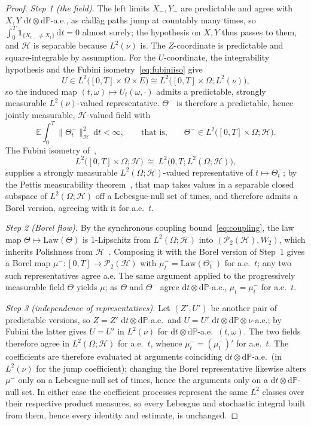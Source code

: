 \documentclass[preprint,12pt]{elsarticle}
\newcommand{\E}{\mathbb{E}}
\newcommand{\Prob}{\mathbb{P}}
\newcommand{\diff}{\mathrm{d}}
\newcommand{\Lnu}{L^2(\nu)}
\newcommand{\Law}{\mathrm{Law}}
\numberwithin{equation}{section}
\theoremstyle{plain}
\theoremstyle{definition}
\theoremstyle{\PaperRemarkStyle}
\begin{document}
\begin{proof}
\emph{Step 1 (the field).} The left limits $X_-,Y_-$ are predictable and agree with $X,Y$
$\diff t\otimes\diff\Prob$-a.e., as c\`adl\`ag paths jump at countably many times, so
$\int_0^T\mathbf 1_{\{X_{t-}\neq X_t\}}\,\diff t=0$ almost surely; the hypothesis on
$X,Y$ thus passes to them, and $\mathcal H$ is separable because $\Lnu$ is. The
$Z$-coordinate is predictable and square-integrable by assumption. For the
$U$-coordinate, the integrability hypothesis and the Fubini
isometry~\eqref{eq:fubiniiso} give
\[
U\in L^2\bigl([0,T]\times\Omega\times E\bigr)\cong L^2\bigl([0,T]\times\Omega;\Lnu\bigr),
\]
so the induced map $(t,\omega)\mapsto U_t(\omega,\cdot)$ admits a predictable, strongly
measurable $\Lnu$-valued representative. $\Theta^-$ is therefore a
predictable, hence jointly measurable, $\mathcal H$-valued field with
\[
\E\int_0^T\|\Theta_t^-\|_{\mathcal H}^2\,\diff t<\infty,
\qquad\text{that is,}\qquad
\Theta^-\in L^2\bigl([0,T]\times\Omega;\mathcal H\bigr).
\]
The Fubini isometry of~\cite[Proposition~1.2.24]{HNVW},
\[
L^2\bigl([0,T]\times\Omega;\mathcal H\bigr)\ \cong\ L^2\bigl(0,T;L^2(\Omega;\mathcal H)\bigr),
\]
supplies a strongly measurable
$L^2(\Omega;\mathcal H)$-valued representative of $t\mapsto\Theta_t^-$; by the Pettis
measurability theorem~\cite[Theorem~1.1.6]{HNVW}, that map takes values in a separable
closed subspace of $L^2(\Omega;\mathcal H)$ off a Lebesgue-null set of times, and
therefore admits a Borel version, agreeing with it for a.e.\ $t$.

\emph{Step 2 (Borel flow).} By the synchronous coupling bound~\eqref{eq:coupling}, the
law map $\Theta\mapsto\Law(\Theta)$ is $1$-Lipschitz from $L^2(\Omega;\mathcal H)$ into
$(\mathcal P_2(\mathcal H),W_2)$, which inherits Polishness from
$\mathcal H$~\cite[Ch.~6]{Villani2009}. Composing it with the Borel version of Step~1 gives a
Borel map $\mu^-:[0,T]\to\mathcal P_2(\mathcal H)$ with $\mu_t^-=\Law(\Theta_t^-)$
for a.e.\ $t$; any two such representatives agree a.e. The same argument applied to
the progressively measurable field $\Theta$ yields $\mu$; as $\Theta$ and $\Theta^-$
agree $\diff t\otimes\diff\Prob$-a.e., $\mu_t=\mu_t^-$ for a.e.\ $t$.

\emph{Step 3 (independence of representatives).} Let $(Z',U')$ be another pair of
predictable versions, so $Z=Z'$ $\diff t\otimes\diff\Prob$-a.e.\ and $U=U'$
$\diff t\otimes\diff\Prob\otimes\nu$-a.e.; by Fubini the latter gives $U=U'$ in $\Lnu$
for $\diff t\otimes\diff\Prob$-a.e.\ $(t,\omega)$. The two fields therefore agree in
$L^2(\Omega;\mathcal H)$ for a.e.\ $t$, whence $\mu_t^-=(\mu_t^-)'$ for a.e.\ $t$. The
coefficients are therefore evaluated at arguments coinciding
$\diff t\otimes\diff\Prob$-a.e.\ (in $\Lnu$ for the jump coefficient); changing the
Borel representative likewise alters $\mu^-$ only on a Lebesgue-null set of times, hence
the arguments only on a $\diff t\otimes\diff\Prob$-null set. In either case the
coefficient processes represent the same $L^2$ classes over their respective product
measures, so every Lebesgue and stochastic integral built from them, hence every
identity and estimate, is unchanged.
\end{proof}
\end{document}
